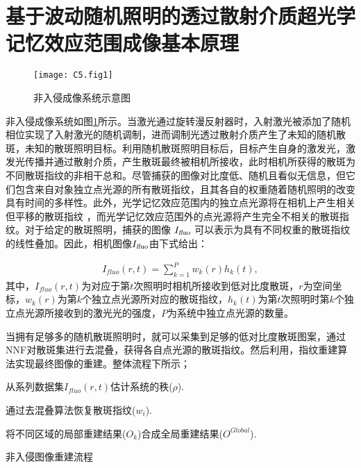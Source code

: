 \section{基于波动随机照明的透过散射介质超光学记忆效应范围成像基本原理}

\begin{figure}[htp]
	\centering
	\texttt{[image: C5.fig1]}
	\caption{非入侵成像系统示意图}
	\label{fig:5.1}
\end{figure}

非入侵成像系统如图\ref{fig:5.1}所示。当激光通过旋转漫反射器时，入射激光被添加了随机相位实现了入射激光的随机调制，进而调制光透过散射介质产生了未知的随机散斑，未知的散斑照明目标。利用随机散斑照明目标后，目标产生自身的激发光，激发光传播并通过散射介质，产生散斑最终被相机所接收，此时相机所获得的散斑为不同散斑指纹的非相干总和。尽管捕获的图像对比度低、随机且看似无信息，但它们包含来自对象独立点光源的所有散斑指纹，且其各自的权重随着随机照明的改变具有时间的多样性。此外，光学记忆效应范围内的独立点光源将在相机上产生相关但平移的散斑指纹 \cite{Freund1988}，而光学记忆效应范围外的点光源将产生完全不相关的散斑指纹。对于给定的散斑照明，捕获的图像 $I_{\textsl{fluo}}$ 可以表示为具有不同权重的散斑指纹的线性叠加。因此，相机图像$I_{\textsl{fluo}}$由下式给出：

\begin{equation}
\begin{aligned}
I_{fluo}(r,t) = \sum^{P}_{k=1} w_{k}(r) h_{k}(t),
\label{eq:5.1}
\end{aligned}
\end{equation}
其中，$I_{fluo}(r,t)$为对应于第$t$次照明时相机所接收到低对比度散斑，$r$为空间坐标，$w_{k}(r)$为第$k$个独立点光源所对应的散斑指纹，$h_{k}(t)$为第$t$次照明时第$k$个独立点光源所接收到的激光光的强度，$P$为系统中独立点光源的数量。

当拥有足够多的随机散斑照明时，就可以采集到足够的低对比度散斑图案，通过NNF对散斑集进行去混叠，获得各自点光源的散斑指纹。然后利用，指纹重建算法实现最终图像的重建。整体流程下所示；
\begin{algorithm2e}[h!]
\DontPrintSemicolon
\SetAlgoLined
{}
从系列数据集$I_{fluo}(r,t)$估计系统的秩($\rho$).\;

通过去混叠算法恢复散斑指纹($w_{i}$).\;


将不同区域的局部重建结果($O_{k}$)合成全局重建结果($O^{Global}$).\;

\caption{非入侵图像重建流程}
\label{alg:a1}
\end{algorithm2e}

